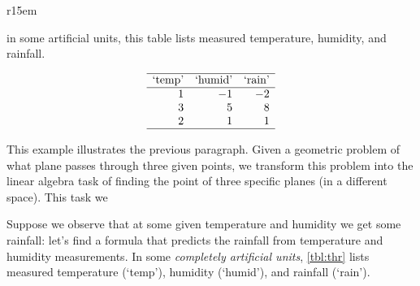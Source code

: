 \begin{wraptable}[9]r{15em}
\caption{in some artificial units, this table lists measured temperature, humidity, and rainfall.}
\label{tbl:thr}
\begin{equation*}
\begin{array}{rrr} \hline
\text{`temp'}&\text{`humid'}&\text{`rain'}\\\hline
1&-1&-2\\
3&5&8\\
2&1&1\\\hline
\end{array}
\end{equation*}
\end{wraptable}
\begin{example} \label{eg:inf3pts}
This example illustrates the previous paragraph.
Given a geometric problem of  what plane passes through three given points, we transform this problem into the linear algebra task of finding the  point of three specific planes (in a different space).
This task we 


Suppose we observe that at some given temperature and humidity we get some rainfall: let's find a formula that predicts the rainfall from temperature and humidity measurements.
In some \emph{completely artificial units}, \cref{tbl:thr} lists measured temperature (`temp'), humidity (`humid'), and rainfall (`rain').


\end{example}
